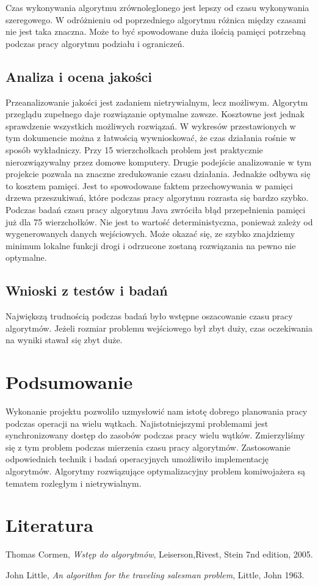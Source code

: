 \documentclass{article}
\begin{document}
	Czas wykonywania algorytmu zrównoleglonego jest lepszy od czasu wykonywania szeregowego. W odróżnieniu od poprzedniego algorytmu różnica między czasami nie jest taka znaczna. Może to być spowodowane duża ilością pamięci potrzebną podczas pracy algorytmu podziału i ograniczeń. 
	
	
	\subsection{Analiza i ocena jakości}
		Przeanalizowanie jakości jest zadaniem nietrywialnym, lecz możliwym. Algorytm przeglądu zupełnego daje rozwiązanie optymalne zawsze. Kosztowne jest jednak sprawdzenie wszystkich możliwych rozwiązań. W wykresów przestawionych w tym dokumencie można z łatwością wywnioskować, że czas działania rośnie w sposób wykładniczy. Przy 15 wierzchołkach problem jest praktycznie nierozwiązywalny przez domowe komputery. Drugie podejście analizowanie w tym projekcie pozwala na znaczne zredukowanie czasu działania. Jednakże odbywa się to kosztem pamięci. Jest to spowodowane faktem przechowywania w pamięci drzewa przeszukiwań, które podczas pracy algorytmu rozrasta się bardzo szybko. Podczas badań czasu pracy algorytmu Java zwróciła błąd przepełnienia pamięci już dla 75 wierzchołków. Nie jest to wartość deterministyczna, ponieważ zależy od wygenerowanych danych wejściowych. Może okazać się, ze szybko znajdziemy minimum lokalne funkcji drogi i odrzucone zostaną rozwiązania na pewno nie optymalne.
	\subsection{Wnioski z testów i badań}
		Największą trudnością podczas badań było wstępne oszacowanie czasu pracy algorytmów. Jeżeli rozmiar problemu wejściowego był zbyt duży, czas oczekiwania na wyniki stawał się zbyt duże.
		
\section{Podsumowanie}
	Wykonanie projektu pozwoliło uzmysłowić nam istotę dobrego planowania pracy podczas operacji na wielu wątkach. Najistotniejszymi problemami jest synchronizowany dostęp do zasobów podczas pracy wielu wątków. Zmierzyliśmy się z tym problem podczas mierzenia czasu pracy algorytmów. Zastosowanie odpowiednich technik i badań operacyjnych umożliwiło implementację algorytmów. Algorytmy rozwiązujące optymalizacyjny problem komiwojażera są tematem rozległym i nietrywialnym.
\section{Literatura}
\printbibliography[heading=none]
\begin{thebibliography}{9}
	
	Thomas Cormen,
	\emph{Wstęp do algorytmów},
	Leiserson,Rivest, Stein
	7nd edition,
	2005.
	
	John Little, 
	\emph{An algorithm for the traveling salesman problem},
	Little, John
	1963.
	\end{thebibliography}
\end{document}
